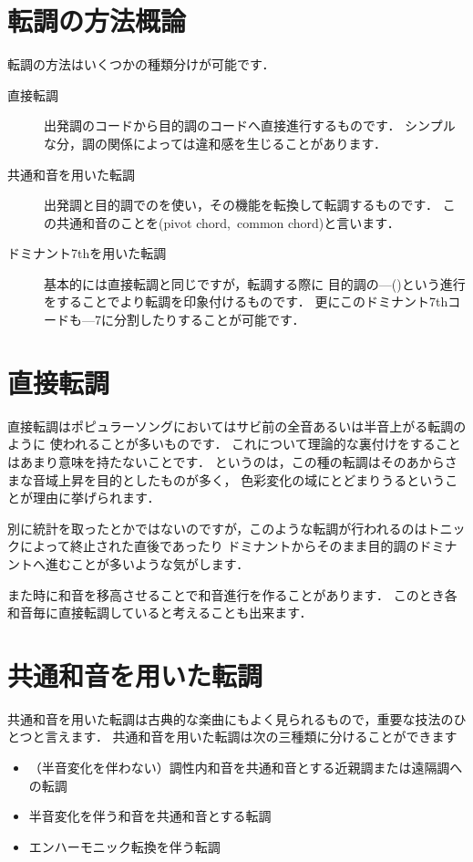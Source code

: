 \documentclass[dvipdfmx,uplatex,b5paper,openany,jbase=12Q,nomag*,textwidth-limit=44%
               ]{gachimuchi}
\begin{document}
\section{転調の方法概論}
転調の方法はいくつかの種類分けが可能です．

\begin{description}
\item[直接転調]
出発調のコードから目的調のコードへ直接進行するものです．
シンプルな分，調の関係によっては違和感を生じることがあります．

\item[共通和音を用いた転調]
出発調と目的調でのを使い，その機能を転換して転調するものです．
この共通和音のことを\xkanjispace(pivot chord,\ common chord)と言います．

\item[ドミナント7thを用いた転調]
基本的には直接転調と同じですが，転調する際に
目的調の\Gnv{}---\Gni(\Min)という進行をすることでより転調を印象付けるものです．
更にこのドミナント7thコードも\Gnii\Min{}---\Gnv\subsc7に分割したりすることが可能です．
\end{description}

\section{直接転調}
直接転調はポピュラーソングにおいてはサビ前の全音あるいは半音上がる転調のように
使われることが多いものです．
これについて理論的な裏付けをすることはあまり意味を持たないことです．
というのは，この種の転調はそのあからさまな音域上昇を目的としたものが多く，
色彩変化の域にとどまりうるということが理由に挙げられます．

\begin{Yodan}
別に統計を取ったとかではないのですが，このような転調が行われるのはトニックによって終止された直後であったり
ドミナントからそのまま目的調のドミナントへ進むことが多いような気がします．
\end{Yodan}

また時に和音を移高させることで和音進行を作ることがあります．
このとき各和音毎に直接転調していると考えることも出来ます．


\section{共通和音を用いた転調}
共通和音を用いた転調は古典的な楽曲にもよく見られるもので，重要な技法のひとつと言えます．
共通和音を用いた転調は次の三種類に分けることができます
\begin{itemize}
  \item （半音変化を伴わない）調性内和音を共通和音とする近親調または遠隔調への転調
  \item 半音変化を伴う和音を共通和音とする転調
  \item エンハーモニック転換を伴う転調
\end{itemize}
\end{document}
